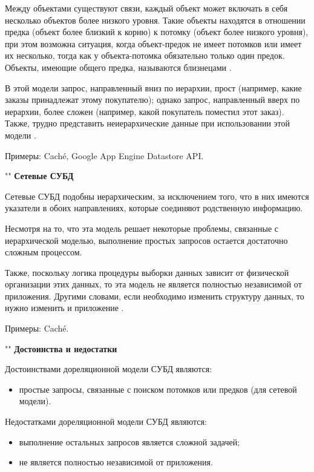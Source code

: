 \documentclass[a4paper]{bmstu}
\begin{document}
Между объектами существуют связи, каждый объект может включать в себя несколько объектов более низкого уровня. Такие объекты находятся в отношении предка (объект более близкий к корню) к потомку (объект более низкого уровня), при этом возможна ситуация, когда объект-предок не имеет потомков или имеет их несколько, тогда как у объекта-потомка обязательно только один предок. Объекты, имеющие общего предка, называются близнецами \cite{scienceforum}.

В этой модели запрос, направленный вниз по иерархии, прост (например, какие заказы принадлежат этому покупателю); однако запрос, направленный вверх по иерархии, более сложен (например, какой покупатель поместил этот заказ). Также, трудно представить неиерархические данные при использовании этой модели \cite{scienceforum}.

Примеры: Caché, Google App Engine Datastore API.

""\newline
\noindent\textbf{Сетевые СУБД}

Сетевые СУБД подобны иерархическим, за исключением того, что в них имеются указатели в обоих направлениях, которые соединяют родственную информацию.

Несмотря на то, что эта модель решает некоторые проблемы, связанные с иерархической моделью, выполнение простых запросов остается достаточно сложным процессом.

Также, поскольку логика процедуры выборки данных зависит от физической организации этих данных, то эта модель не является полностью независимой от приложения. Другими словами, если необходимо изменить структуру данных, то нужно изменить и приложение \cite{scienceforum}.

Примеры: Caché.

""\newline
\noindent\textbf{Достоинства и недостатки}

Достоинствами дореляционной модели СУБД являются:

\begin{itemize}
	\item простые запросы, связанные с поиском потомков или предков (для сетевой модели).
\end{itemize}

Недостатками дореляционной модели СУБД являются:

\begin{itemize}
	\item выполнение остальных запросов является сложной задачей;
	\item не является полностью независимой от приложения.
\end{itemize}
\end{document}

